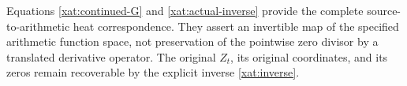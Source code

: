 Equations \eqref{xat:continued-G} and \eqref{xat:actual-inverse}
provide the complete source-to-arithmetic heat correspondence.
They assert an invertible map of the specified arithmetic
function space, not preservation of the pointwise zero divisor
by a translated derivative operator. The original \(Z_t\),
its original coordinates, and its zeros remain recoverable by
the explicit inverse \eqref{xat:inverse}.
